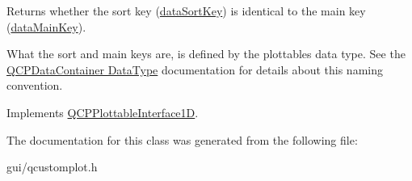 Returns whether the sort key (\hyperlink{classQCPAbstractPlottable1D_aa8277da921b009bce474437d50b4a2d8}{data\+Sort\+Key}) is identical to the main key (\hyperlink{classQCPAbstractPlottable1D_aeb156ebf5d3c8de906b428be30733ad8}{data\+Main\+Key}).

What the sort and main keys are, is defined by the plottable\textquotesingle{}s data type. See the \hyperlink{classQCPDataContainer_qcpdatacontainer-datatype}{Q\+C\+P\+Data\+Container Data\+Type} documentation for details about this naming convention. 

Implements \hyperlink{classQCPPlottableInterface1D_a229e65e7ab968dd6cd0e259fa504b79d}{Q\+C\+P\+Plottable\+Interface1D}.



The documentation for this class was generated from the following file\+:\begin{DoxyCompactItemize}
\item 
gui/qcustomplot.\+h\end{DoxyCompactItemize}
